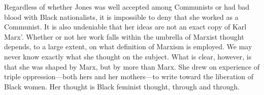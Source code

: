 \documentclass[man,12pt,natbib]{apa6}
\begin{document}
Regardless of whether Jones was well accepted among Communists or had bad blood
with Black nationalists, it is impossible to deny that she worked as a
Communist.  It is also undeniable that her ideas are not an exact copy of Karl
Marx'. Whether or not her work falls within the umbrella of Marxist thought 
depends, to a large extent, on what definition of Marxism is employed.
We may never know exactly what she thought on the subject.  What is clear,
however, is that she was shaped by Marx, but by more than Marx. She drew on
experience of triple oppression---both hers and her mothers---to write toward
the liberation of Black women. Her thought is Black feminist thought, through
and through.

\nocite{Azikiwe13}
\nocite{Haan13}
\nocite{Johnson84}
\nocite{Keith13}
\nocite{Mahamdallie04}
\nocite{Shabazz09}
\nocite{Taylor08}
\nocite{Thomson09}
\nocite{Washington03}

\clearpage

\end{document}
